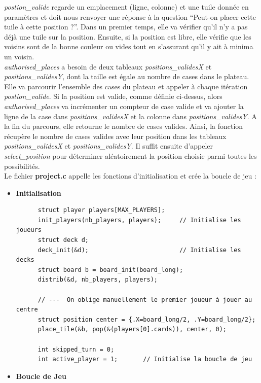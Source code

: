 \documentclass[a4paper]{article}
\begin{document}
\emph{postion\_valide} regarde un emplacement (ligne, colonne) et une tuile donnée en paramètres et doit nous renvoyer une réponse à la question ``Peut-on placer cette tuile à cette  position ?''. Dans un premier temps, elle va vérifier qu'il n'y a pas déjà une tuile sur la position. Ensuite, si la position est libre, elle vérifie que les voisins sont de la bonne couleur ou vides tout en s'assurant qu'il y ait à minima un voisin. \\

\emph{authorised\_places} a besoin de deux tableaux \emph{positions\_validesX} et \emph{positions\_validesY}, dont la taille est égale au nombre de cases dans le plateau. Elle va parcourir l'ensemble des cases du plateau et appeler à chaque itération \emph{postion\_valide}. Si la position est valide, comme définie ci-dessus, alors \emph{authorised\_places} va incrémenter un compteur de case valide et va ajouter la ligne de la case dans \emph{positions\_validesX} et la colonne dans \emph{positions\_validesY}. A la fin du parcours, elle retourne le nombre de cases valides. Ainsi, la fonction récupère le nombre de cases valides avec leur position dans les tableaux \emph{positions\_validesX} et \emph{positions\_validesY}. Il suffit ensuite d'appeler \emph{select\_position} pour déterminer aléatoirement la position choisie parmi toutes les possibilités. \\

Le fichier \textbf{project.c} appelle les fonctions d'initialisation et crée la boucle de jeu : 


\begin{itemize}
    \item \textbf{Initialisation}

    \begin{lstlisting}
      struct player players[MAX_PLAYERS];
      init_players(nb_players, players);     // Initialise les joueurs
      struct deck d;
      deck_init(&d);                         // Initialise les decks
      struct board b = board_init(board_long);
      distrib(&d, nb_players, players);
      
      // ---  On oblige manuellement le premier joueur à jouer au centre
      struct position center = {.X=board_long/2, .Y=board_long/2};     
      place_tile(&b, pop(&(players[0].cards)), center, 0);
      
      int skipped_turn = 0;
      int active_player = 1;       // Initialise la boucle de jeu      
    \end{lstlisting}
    \newpage


    \item \textbf{Boucle de Jeu}
    
\end{itemize}    
\end{document}
